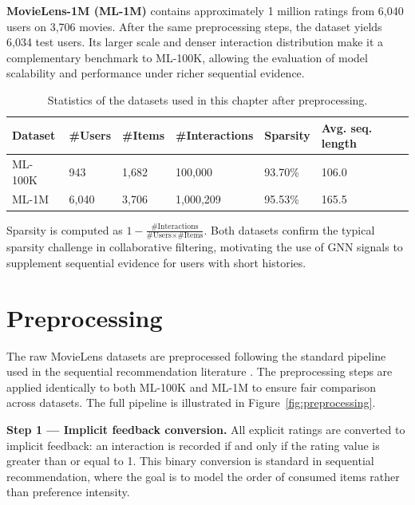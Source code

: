 \documentclass[12pt,a4paper]{report}
\begin{document}
\textbf{MovieLens-1M (ML-1M)} contains approximately 1 million ratings from
6,040 users on 3,706 movies. After the same preprocessing steps, the dataset
yields 6,034 test users. Its larger scale and denser interaction distribution
make it a complementary benchmark to ML-100K, allowing the evaluation of
model scalability and performance under richer sequential evidence.

\begin{table}[h]
\centering
\caption{Statistics of the datasets used in this chapter after preprocessing.}
\label{tab:datasets}
\begin{tabular}{p{2.8cm} p{1.8cm} p{1.8cm} p{2.5cm} p{2.2cm} p{2.2cm}}
\toprule
\textbf{Dataset} & \textbf{\#Users} & \textbf{\#Items} &
\textbf{\#Interactions} & \textbf{Sparsity} & \textbf{Avg. seq. length} \\
\midrule
ML-100K & 943  & 1,682 & 100,000   & 93.70\% & 106.0 \\
ML-1M   & 6,040 & 3,706 & 1,000,209 & 95.53\% & 165.5 \\
\bottomrule
\end{tabular}
\end{table}

\noindent Sparsity is computed as
\(1 - \frac{\text{\#Interactions}}{\text{\#Users} \times \text{\#Items}}\).
Both datasets confirm the typical sparsity challenge in collaborative filtering,
motivating the use of GNN signals to supplement sequential evidence for users
with short histories.

\section{Preprocessing}
\label{sec:preprocessing}

The raw MovieLens datasets are preprocessed following the standard pipeline
used in the sequential recommendation literature
\citep{kang2018sasrec, sun2019bert4rec, pan2024survey}. The preprocessing
steps are applied identically to both ML-100K and ML-1M to ensure fair
comparison across datasets. The full pipeline is illustrated in
Figure~\ref{fig:preprocessing}.

\textbf{Step 1 — Implicit feedback conversion.}
All explicit ratings are converted to implicit feedback: an interaction is
recorded if and only if the rating value is greater than or equal to 1. This
binary conversion is standard in sequential recommendation, where the goal is
to model the order of consumed items rather than preference intensity.
\end{document}
